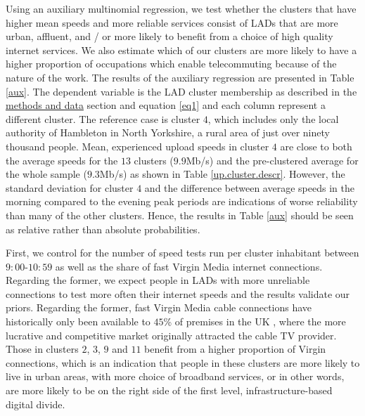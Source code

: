 \documentclass[Royal,times,sageh]{sagej}
\begin{document}
Using an auxiliary multinomial regression, we test whether the clusters
that have higher mean speeds and more reliable services consist of LADs
that are more urban, affluent, and / or more likely to benefit from a
choice of high quality internet services. We also estimate which of our
clusters are more likely to have a higher proportion of occupations
which enable telecommuting because of the nature of the work. The
results of the auxiliary regression are presented in Table \ref{aux}.
The dependent variable is the LAD cluster membership as described in the
\protect\hyperlink{sec:3}{methods and data} section and equation
\ref{eq1} and each column represent a different cluster. The reference
case is cluster \(4\), which includes only the local authority of
Hambleton in North Yorkshire, a rural area of just over ninety thousand
people. Mean, experienced upload speeds in cluster \(4\) are close to
both the average speeds for the \(13\) clusters (\(9.9\)Mb/s) and the
pre-clustered average for the whole sample (\(9.3\)Mb/s) as shown in
Table \ref{up.cluster.descr}. However, the standard deviation for
cluster \(4\) and the difference between average speeds in the morning
compared to the evening peak periods are indications of worse
reliability than many of the other clusters. Hence, the results in Table
\ref{aux} should be seen as relative rather than absolute probabilities.

First, we control for the number of speed tests run per cluster
inhabitant between \(9:00\)-\(10:59\) as well as the share of fast
Virgin Media internet connections. Regarding the former, we expect
people in LADs with more unreliable connections to test more often their
internet speeds and the results validate our priors. Regarding the
former, fast Virgin Media cable connections have historically only been
available to \(45\)\% of premises in the UK \citep{ofcom2016}, where the
more lucrative and competitive market originally attracted the cable TV
provider. Those in clusters \(2\), \(3\), \(9\) and \(11\) benefit from
a higher proportion of Virgin connections, which is an indication that
people in these clusters are more likely to live in urban areas, with
more choice of broadband services, or in other words, are more likely to
be on the right side of the first level, infrastructure-based digital
divide.
\end{document}
